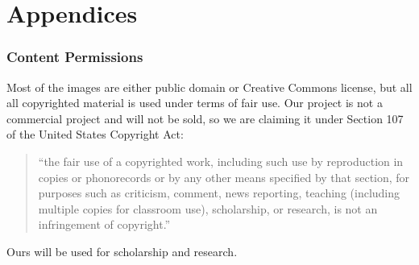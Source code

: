 \documentclass[a4paper,10pt]{article}
\begin{document}
\pagebreak


\section{Appendices}

\subsubsection{Content Permissions}
Most of the images are either public domain or Creative Commons license, but all all copyrighted material is used under terms of fair use.  Our project is not a commercial project and will not be sold, so we are claiming it under Section 107 of the United States Copyright Act:
\begin{quotation}
	``the fair use of a copyrighted work, including such use by reproduction in copies or phonorecords or by any other means specified by that section, for purposes such as criticism, comment, news reporting, teaching (including multiple copies for classroom use), scholarship, or research, is not an infringement of copyright.''
\end{quotation}

Ours will be used for scholarship and research.

\end{document}
